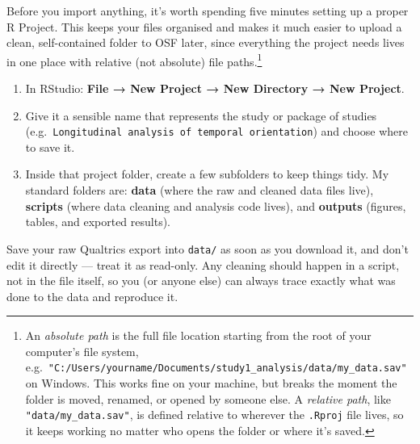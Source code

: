 \documentclass[
  letterpaper,
  DIV=11,
  numbers=noendperiod]{scrreprt}
\providecommand{\tightlist}{%
  \setlength{\itemsep}{0pt}\setlength{\parskip}{0pt}}\usepackage{longtable,booktabs,array}
\begin{document}
Before you import anything, it's worth spending five minutes setting up
a proper R Project. This keeps your files organised and makes it much
easier to upload a clean, self-contained folder to OSF later, since
everything the project needs lives in one place with relative (not
absolute) file paths.\footnote{An \emph{absolute path} is the full file
  location starting from the root of your computer's file system,
  e.g.~\texttt{"C:/Users/yourname/Documents/study1\_analysis/data/my\_data.sav"}
  on Windows. This works fine on your machine, but breaks the moment the
  folder is moved, renamed, or opened by someone else. A \emph{relative
  path}, like \texttt{"data/my\_data.sav"}, is defined relative to
  wherever the \texttt{.Rproj} file lives, so it keeps working no matter
  who opens the folder or where it's saved.}

\begin{enumerate}
\def\labelenumi{\arabic{enumi}.}
\tightlist
\item
  In RStudio: \textbf{File → New Project → New Directory → New Project}.
\item
  Give it a sensible name that represents the study or package of
  studies
  (e.g.~\texttt{Longitudinal\ analysis\ of\ temporal\ orientation}) and
  choose where to save it.
\item
  Inside that project folder, create a few subfolders to keep things
  tidy. My standard folders are: \textbf{data} (where the raw and
  cleaned data files live), \textbf{scripts} (where data cleaning and
  analysis code lives), and \textbf{outputs} (figures, tables, and
  exported results).
\end{enumerate}

\begin{tcolorbox}[enhanced jigsaw, toprule=.15mm, coltitle=black, colframe=quarto-callout-important-color-frame, colbacktitle=quarto-callout-important-color!10!white, opacityback=0, left=2mm, breakable, rightrule=.15mm, bottomrule=.15mm, leftrule=.75mm, titlerule=0mm, arc=.35mm, opacitybacktitle=0.6, toptitle=1mm, bottomtitle=1mm, title=\textcolor{quarto-callout-important-color}{\faExclamation}\hspace{0.5em}{Important}, colback=white]

Save your raw Qualtrics export into \texttt{data/} as soon as you
download it, and don't edit it directly --- treat it as read-only. Any
cleaning should happen in a script, not in the file itself, so you (or
anyone else) can always trace exactly what was done to the data and
reproduce it.

\end{tcolorbox}
\end{document}
